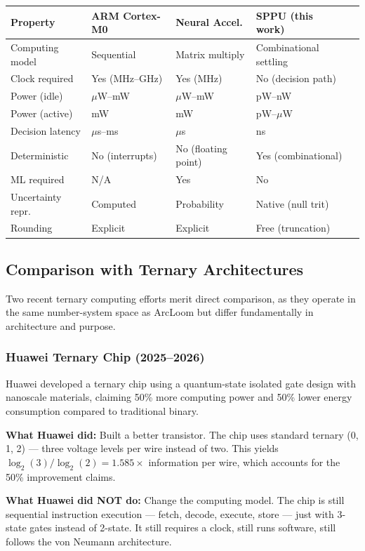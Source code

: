 \documentclass[11pt, a4paper]{article}
\begin{document}
\begin{center}
\begin{tabular}{@{}lllll@{}}
\toprule
\textbf{Property} & \textbf{ARM Cortex-M0} & \textbf{Neural Accel.} & \textbf{SPPU (this work)} \\
\midrule
Computing model & Sequential & Matrix multiply & Combinational settling \\
Clock required & Yes (MHz--GHz) & Yes (MHz) & No (decision path) \\
Power (idle) & $\mu$W--mW & $\mu$W--mW & pW--nW \\
Power (active) & mW & mW & pW--$\mu$W \\
Decision latency & $\mu$s--ms & $\mu$s & ns \\
Deterministic & No (interrupts) & No (floating point) & Yes (combinational) \\
ML required & N/A & Yes & No \\
Uncertainty repr. & Computed & Probability & Native (null trit) \\
Rounding & Explicit & Explicit & Free (truncation) \\
\bottomrule
\end{tabular}
\end{center}

\subsection{Comparison with Ternary Architectures}

Two recent ternary computing efforts merit direct comparison, as they
operate in the same number-system space as ArcLoom but differ
fundamentally in architecture and purpose.

\subsubsection{Huawei Ternary Chip (2025--2026)}

Huawei developed a ternary chip using a quantum-state isolated gate
design with nanoscale materials, claiming 50\% more computing power
and 50\% lower energy consumption compared to traditional binary.

\textbf{What Huawei did:} Built a better transistor. The chip uses
standard ternary (0, 1, 2) --- three voltage levels per wire instead
of two. This yields $\log_2(3)/\log_2(2) = 1.585\times$ information
per wire, which accounts for the 50\% improvement claims.

\textbf{What Huawei did NOT do:} Change the computing model. The
chip is still sequential instruction execution --- fetch, decode,
execute, store --- just with 3-state gates instead of 2-state.
It still requires a clock, still runs software, still follows the
von Neumann architecture.
\end{document}
